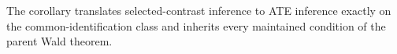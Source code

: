 The corollary translates selected-contrast inference to ATE inference exactly on the common-identification class and inherits every maintained condition of the parent Wald theorem.